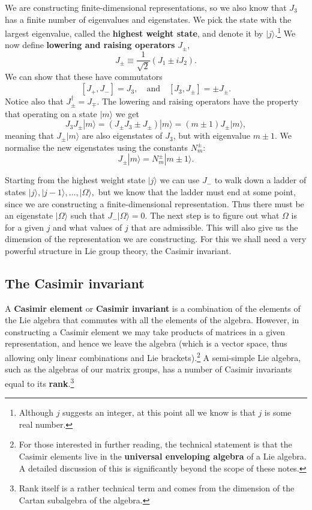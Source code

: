 \documentclass[notes.tex]{subfiles}
\begin{document}
We are constructing finite-dimensional representations, so we also know that $J_3$ has a finite number of eigenvalues and eigenstates. We pick the state with the largest eigenvalue, called the {\bf highest weight state}, and denote it by $|j\rangle$.\footnote{Although $j$ suggests an integer, at this point all we know is that $j$ is some real number.} We now define {\bf lowering and raising operators} $J_\pm$,
\[ J_\pm \equiv\frac{1}{\sqrt{2}}(J_1\pm i J_2). \]
We can show that these have commutators
\[ [J_+, J_-]=J_3,\quad\text{and}\quad [J_3,J_\pm]=\pm J_\pm. \]
Notice also that $J_\pm^\dagger=J_\mp$. 
The lowering and raising operators have the property that operating on a state $|m\rangle$ we get 
\[ J_3J_\pm |m\rangle=(J_\pm J_3\pm J_\pm)|m\rangle=(m\pm1)J_\pm|m\rangle, \]
meaning that $J_\pm |m\rangle$ are also eigenstates of $J_3$, but with eigenvalue $m\pm1$. 
We normalise the new eigenstates using the constants $N_m^\pm$:
\[ J_\pm|m\rangle = N_m^\pm |m\pm1\rangle. \]

Starting from the highest weight state $|j\rangle$ we can use $J_-$ to walk down a ladder of states
$|j\rangle, |j-1\rangle,\ldots,|\Omega\rangle,$ but we know that the ladder must end at some point, since we are constructing a finite-dimensional representation. Thus there must be an eigenstate $|\Omega\rangle$ such that
$J_-|\Omega\rangle=0$.
The next step is to figure out what $\Omega$ is for a given $j$ and what values of $j$ that are admissible. This will also give us the dimension of the representation we are constructing. For this we shall need a very powerful structure in Lie group theory, the Casimir invariant.


\subsection{The Casimir invariant}
A {\bf Casimir element} or {\bf Casimir invariant} is a combination of the elements of the Lie algebra that commutes with all the elements of the algebra. However, in constructing a Casimir element we may take products of matrices in a given representation, and hence we leave the algebra (which is a vector space, thus allowing only linear combinations and Lie brackets).\footnote{For those interested in further reading, the technical statement is that the Casimir elements live in the {\bf universal enveloping algebra} of a Lie algebra. A detailed discussion of this is significantly beyond the scope of these notes.}
A semi-simple Lie algebra, such as the algebras of our matrix groups, has a number of Casimir invariants equal to its {\bf rank}.\footnote{Rank itself is a rather technical term and comes from the dimension of the Cartan subalgebra of the algebra.} 
\end{document}
